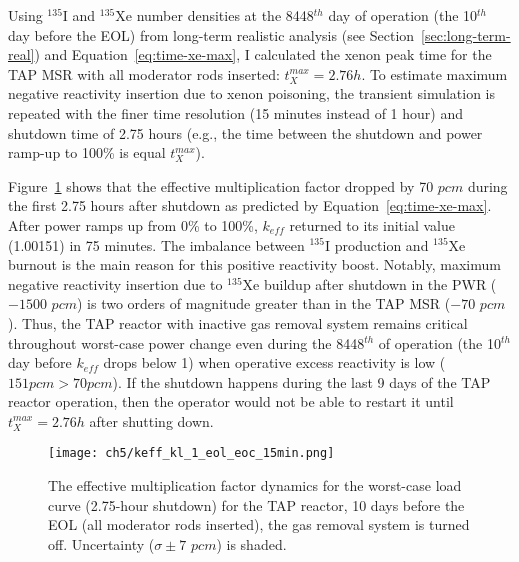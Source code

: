 Using $^{135}$I and $^{135}$Xe number densities at the 8448$^{th}$ day of 
operation (the 10$^{th}$ day before the \gls{EOL}) from long-term realistic 
analysis 
(see Section~\ref{sec:long-term-real}) and Equation~\ref{eq:time-xe-max}, I 
calculated the xenon peak time for the \gls{TAP} \gls{MSR} with all moderator 
rods inserted: $t^{max}_X=2.76h$. To estimate maximum negative reactivity 
insertion due to xenon poisoning, the transient simulation is repeated with 
the finer time resolution (15 minutes instead of 1 hour) and shutdown time of 
2.75 hours (e.g., the time between the shutdown and power ramp-up to 100\% is 
equal $t^{max}_X$).

Figure~\ref{fig:lf-tap-keff-eol-eoc-no-15} shows that the effective 
multiplication factor dropped by 70 $pcm$ during the first 2.75 hours after 
shutdown as predicted by Equation~\ref{eq:time-xe-max}. After power ramps up 
from 0\% to 100\%, $k_{eff}$ returned to its initial value (1.00151) in 75 
minutes. The imbalance between $^{135}$I production and $^{135}$Xe burnout is 
the main reason for this positive reactivity boost. Notably, maximum negative 
reactivity insertion due to $^{135}$Xe buildup after shutdown in the 
\gls{PWR} ($-1500$ $pcm$) is two orders of magnitude greater than in the 
\gls{TAP} \gls{MSR} ($-70$ $pcm$).
Thus, the \gls{TAP} reactor with inactive gas removal system remains critical 
throughout worst-case power change even during the 8448$^{th}$ of operation 
(the 10$^{th}$ day before $k_{eff}$ drops below 1) when operative excess 
reactivity is low ($151pcm>70pcm$). If the shutdown happens during the last 9 
days of the \gls{TAP} reactor operation, then the operator would not be able 
to restart it until $t^{max}_X=2.76h$ after shutting down.
\begin{figure}[htp!] %
	\centering
	\texttt{[image: ch5/keff\_kl\_1\_eol\_eoc\_15min.png]}
	\caption{The effective multiplication factor dynamics for the worst-case 
		load curve (2.75-hour shutdown) for the \gls{TAP} reactor, 10 days 
		before the \gls{EOL} (all moderator rods inserted), the gas removal 
		system is turned off. Uncertainty ($\sigma\pm7$ $pcm$) is shaded.}
	\label{fig:lf-tap-keff-eol-eoc-no-15}
\end{figure}


